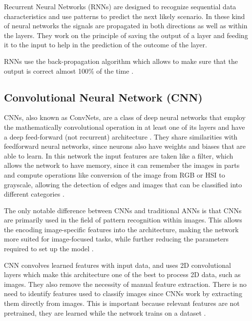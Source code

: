             \par Recurrent Neural Networks (RNNs) are designed to recognize sequential data characteristics and use patterns to predict the next likely scenario. In these kind of neural networks the signals are propagated in both directions as well as within the layers. They work on the principle of saving the output of a layer and feeding it to the input to help in the prediction of the outcome of the layer.
            \par RNNs use the back-propagation algorithm which allows to make sure that the output is correct almost 100\% of the time \cite{ArmaanMerchant2018}.
        


            \subsection{Convolutional Neural Network (CNN)}
            
            \par CNNs, also known as ConvNets, are a class of deep neural networks that employ the mathematically convolutional operation in at least one of its layers and have a deep feed-forward (not recurrent) architecture \cite{Ribeiro}. They share similarities with feedforward neural networks, since neurons also have weights and biases that are able to learn. In this network the input features are taken like a filter, which allows the network to have memory, since it can remember the images in parts and compute operations like conversion of the image from RGB or HSI to grayscale, allowing the detection of edges and images that can be classified into different categories \cite{ArmaanMerchant2018}. 

            \par The only notable difference between CNNs and traditional ANNs is that CNNs are primarily used in the field of pattern recognition within images. This allows the encoding image-specific features into the architecture, making the network more suited for image-focused tasks, while further reducing the parameters required to set up the model \cite{OShea2015}.
            
            

            \par CNN convolves learned features with input data, and uses 2D convolutional layers which make this architecture one of the best to process 2D data, such as images. They also remove the necessity of manual feature extraction. There is no need to identify features used to classify images since CNNs work by extracting them directly from images. This is important because relevant features are not pretrained, they are learned while the network trains on a dataset \cite{mathworks_deeplearning}.

